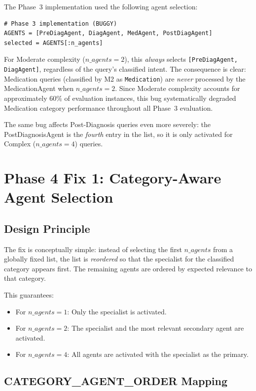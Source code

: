 \documentclass[a4paper,12pt]{article}
\begin{document}
The Phase~3 implementation used the following agent selection:
\begin{verbatim}
# Phase 3 implementation (BUGGY)
AGENTS = [PreDiagAgent, DiagAgent, MedAgent, PostDiagAgent]
selected = AGENTS[:n_agents]
\end{verbatim}

For Moderate complexity ($n\_agents{=}2$), this \emph{always} selects
\texttt{[PreDiagAgent, DiagAgent]}, regardless of the query's classified
intent. The consequence is clear: Medication queries (classified by M2
as \texttt{Medication}) are \emph{never} processed by the MedicationAgent
when $n\_agents{=}2$. Since Moderate complexity accounts for approximately
$60\%$ of evaluation instances, this bug systematically degraded
Medication category performance throughout all Phase~3 evaluation.

The same bug affects Post-Diagnosis queries even more severely: the
PostDiagnosisAgent is the \emph{fourth} entry in the list, so it is
only activated for Complex ($n\_agents{=}4$) queries.

\section{Phase 4 Fix 1: Category-Aware Agent Selection}

\subsection{Design Principle}

The fix is conceptually simple: instead of selecting the first
$n\_agents$ from a globally fixed list, the list is \emph{reordered}
so that the specialist for the classified category appears first. The
remaining agents are ordered by expected relevance to that category.

This guarantees:
\begin{itemize}[noitemsep]
  \item For $n\_agents{=}1$: Only the specialist is activated.
  \item For $n\_agents{=}2$: The specialist and the most relevant
        secondary agent are activated.
  \item For $n\_agents{=}4$: All agents are activated with the specialist
        as the primary.
\end{itemize}

\subsection{CATEGORY\_AGENT\_ORDER Mapping}
\end{document}
